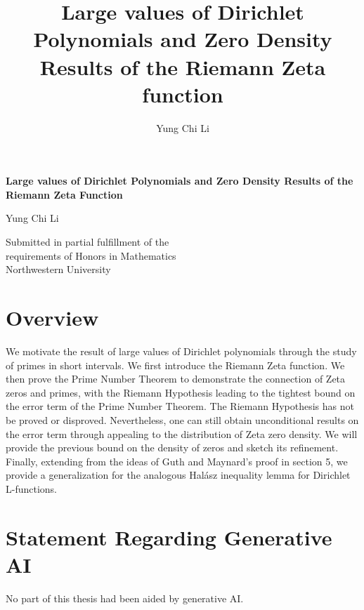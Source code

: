 \documentclass[openany,
ngerman,
toc=flat,
toc=chapterentrywithdots,
captions=tableabove,
listof=entryprefix,
listof=leveldown,
fontsize=12pt,
numbers=noenddot]
{book}
\title{Large values of Dirichlet Polynomials and Zero Density Results of the Riemann Zeta function}
\author{Yung Chi Li}
\date{}
\begin{document}
\begin{titlepage}
    \begin{center}
        \vspace*{1cm}
            
        \Large
        \textbf{Large values of Dirichlet Polynomials and Zero Density Results of the Riemann Zeta Function}
            
        \vspace{0.5cm}
        
        \Large
        Yung Chi Li
            
        \vfill
            
       	Submitted in partial fulfillment of the\\ requirements of
		Honors in Mathematics\\
		
		
		Northwestern University
            
    
            
    \end{center}
\end{titlepage}

\section*{Overview}
	We motivate the result of large values of Dirichlet polynomials through the study of primes in short intervals. We first introduce the Riemann Zeta function. We then prove the Prime Number Theorem to demonstrate the connection of Zeta zeros and primes, with the Riemann Hypothesis leading to the tightest bound on the error term of the Prime Number Theorem. 
	The Riemann Hypothesis has not be proved or disproved. Nevertheless, one can still obtain unconditional results on the error term through appealing to the distribution of Zeta zero density. We will provide the previous bound on the density of zeros and sketch its refinement. Finally, extending from the ideas of Guth and Maynard's proof in section 5, we provide a generalization for the analogous Hal\'asz inequality lemma for Dirichlet L-functions.


{\let\clearpage\relax \tableofcontents}
\section*{Statement Regarding Generative AI}
No part of this thesis had been aided by generative AI.
\end{document}
